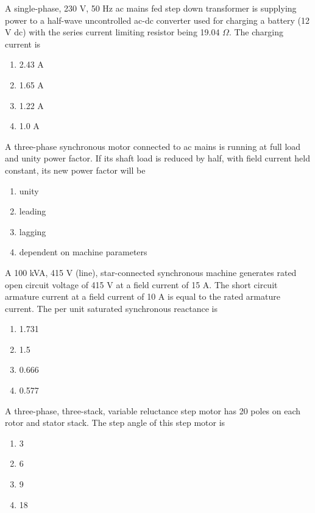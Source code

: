 \item A single-phase, 230 V, 50 Hz ac mains fed step down transformer  is supplying power to a half-wave uncontrolled ac-dc converter used for charging a battery (12 V dc) with the series current limiting resistor being 19.04 $\Omega$. The charging current is
\begin{enumerate}
    \item 2.43 A
    \item 1.65 A
    \item 1.22 A
    \item 1.0 A \\
\end{enumerate}
\item A three-phase synchronous motor connected to ac mains is running at full load and unity power factor. If its shaft load is reduced by half, with field current held constant, its new power factor will be
\begin{enumerate}
    \item unity
    \item leading
    \item lagging
    \item dependent on machine parameters \\
\end{enumerate}
\item A 100 kVA, 415 V (line), star-connected synchronous machine generates rated open circuit voltage of 415 V at a field current of 15 A. The short circuit armature current at a field current of 10 A is equal to the rated armature current. The per unit saturated synchronous reactance is
\begin{enumerate}
    \item 1.731
    \item 1.5
    \item 0.666
    \item 0.577 \\
\end{enumerate}
\item A three-phase, three-stack, variable reluctance step motor has 20 poles on each rotor and stator stack. The step angle of this step motor is
\begin{enumerate}
    \item 3\degree
    \item 6\degree
    \item 9\degree
    \item 18\degree \\
\end{enumerate}
